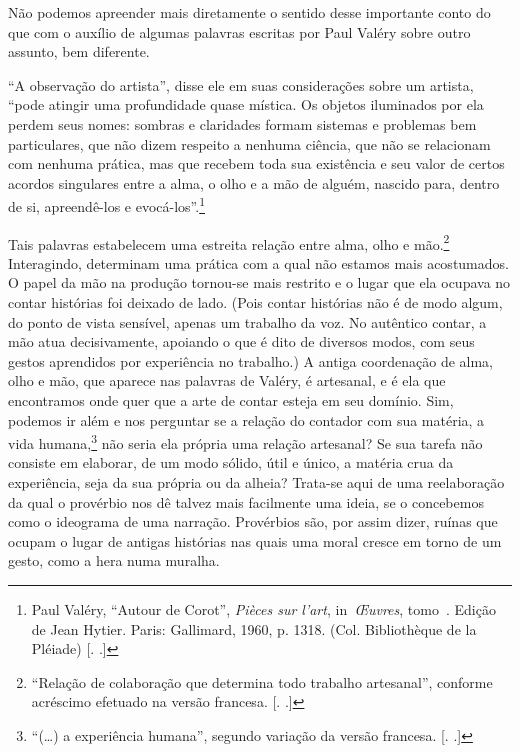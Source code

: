 Não podemos apreender mais diretamente o sentido desse importante conto
do que com o auxílio de algumas palavras escritas por Paul Valéry sobre
outro assunto, bem diferente.

``A observação do artista'', disse ele em suas considerações sobre um
artista, ``pode atingir uma profundidade quase mística. Os objetos
iluminados por ela perdem seus nomes: sombras e claridades formam
sistemas e problemas bem particulares, que não dizem respeito a nenhuma
ciência, que não se relacionam com nenhuma prática, mas que recebem toda
sua existência e seu valor de certos acordos singulares entre a alma, o
olho e a mão de alguém, nascido para, dentro de si, apreendê-los e
evocá-los''.\footnote{Paul Valéry, ``Autour de Corot'', \emph{Pièces sur
  l'art}, in~\emph{Œuvres}, tomo~. Edição de Jean Hytier. Paris:
  Gallimard, 1960, p. 1318. (Col. Bibliothèque de la Pléiade) [. .]}

Tais palavras estabelecem uma estreita relação entre alma, olho e
mão.\footnote{``Relação de colaboração que determina todo trabalho
  artesanal'', conforme acréscimo efetuado na versão francesa. [. 
  .]} Interagindo, determinam uma prática com a qual não estamos mais
acostumados. O papel da mão na produção tornou-se mais restrito e o
lugar que ela ocupava no contar histórias foi deixado de lado. (Pois
contar histórias não é de modo algum, do ponto de vista sensível, apenas
um trabalho da voz. No autêntico contar, a mão atua decisivamente,
apoiando o que é dito de diversos modos, com seus gestos aprendidos por
experiência no trabalho.) A antiga coordenação de alma, olho e mão, que
aparece nas palavras de Valéry, é artesanal, e é ela que encontramos
onde quer que a arte de contar esteja em seu domínio. Sim, podemos ir
além e nos perguntar se a relação do contador com sua matéria, a vida
humana,\footnote{``(\ldots{}) a experiência humana'', segundo variação da versão
  francesa. [. .]} não seria ela própria uma relação
artesanal? Se sua tarefa não consiste em elaborar, de um modo sólido,
útil e único, a matéria crua da experiência, seja da sua própria ou da
alheia? Trata-se aqui de uma reelaboração da qual o provérbio nos dê
talvez mais facilmente uma ideia, se o concebemos como o ideograma de
uma narração. Provérbios são, por assim dizer, ruínas que ocupam o lugar
de antigas histórias nas quais uma moral cresce em torno de um gesto,
como a hera numa muralha.

